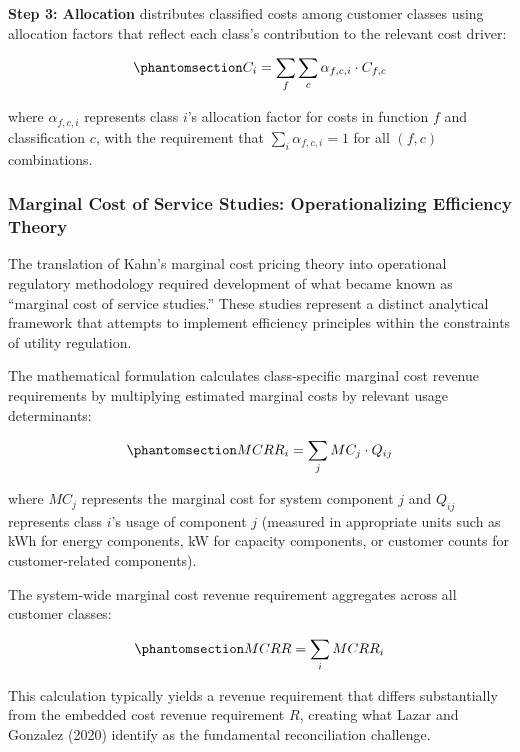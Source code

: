 \documentclass[
  11pt,
]{article}
\begin{document}
\textbf{Step 3: Allocation} distributes classified costs among customer
classes using allocation factors that reflect each class's contribution
to the relevant cost driver:

\begin{equation}\phantomsection\label{eq-final-allocation}{C_i = \sum_f \sum_c \alpha_{f,c,i} \cdot C_{f,c}}\end{equation}

where \(\alpha_{f,c,i}\) represents class \(i\)'s allocation factor for
costs in function \(f\) and classification \(c\), with the requirement
that \(\sum_i \alpha_{f,c,i} = 1\) for all \((f,c)\) combinations.

\subsubsection{Marginal Cost of Service Studies: Operationalizing
Efficiency
Theory}\label{marginal-cost-of-service-studies-operationalizing-efficiency-theory}

The translation of Kahn's marginal cost pricing theory into operational
regulatory methodology required development of what became known as
``marginal cost of service studies.'' These studies represent a distinct
analytical framework that attempts to implement efficiency principles
within the constraints of utility regulation.

The mathematical formulation calculates class-specific marginal cost
revenue requirements by multiplying estimated marginal costs by relevant
usage determinants:

\begin{equation}\phantomsection\label{eq-mcrr-class}{MCRR_i = \sum_j MC_j \cdot Q_{ij}}\end{equation}

where \(MC_j\) represents the marginal cost for system component \(j\)
and \(Q_{ij}\) represents class \(i\)'s usage of component \(j\)
(measured in appropriate units such as kWh for energy components, kW for
capacity components, or customer counts for customer-related
components).

The system-wide marginal cost revenue requirement aggregates across all
customer classes:

\begin{equation}\phantomsection\label{eq-mcrr-total}{MCRR = \sum_i MCRR_i}\end{equation}

This calculation typically yields a revenue requirement that differs
substantially from the embedded cost revenue requirement \(R\), creating
what Lazar and Gonzalez (2020) identify as the fundamental
reconciliation challenge.
\end{document}
